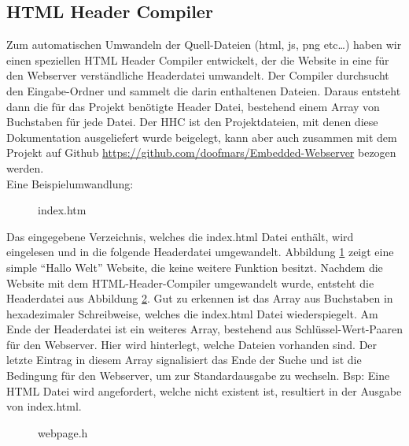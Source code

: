 \newpage

\subsection{HTML Header Compiler}
\label{chap:hintergrund.HHC}

Zum automatischen Umwandeln der Quell-Dateien (html, js, png etc\ldots) haben
wir einen speziellen HTML Header Compiler entwickelt, der die Website in eine
für den Webserver verständliche Headerdatei umwandelt. Der Compiler durchsucht
den Eingabe-Ordner und sammelt die darin enthaltenen Dateien. Daraus entsteht
dann die für das Projekt benötigte Header Datei, bestehend einem Array von
Buchstaben für jede Datei. Der \ac{HHC} ist den Projektdateien, mit denen diese
Dokumentation ausgeliefert wurde beigelegt, kann aber auch zusammen mit dem
Projekt auf Github \url{https://github.com/doofmars/Embedded-Webserver}
bezogen werden.\\

Eine Beispielumwandlung: 

\begin{figure}[H]

\caption{index.htm}
\label{HHC.input}
\end{figure}

Das eingegebene Verzeichnis, welches die \textrm{index.html} Datei enthält, wird
eingelesen und in die folgende Headerdatei umgewandelt.
Abbildung \ref{HHC.input} zeigt eine simple "`Hallo Welt"' Website, die keine
weitere Funktion besitzt. Nachdem die Website mit dem HTML-Header-Compiler
umgewandelt wurde, entsteht die Headerdatei aus Abbildung \ref{HHC.output}. Gut
zu erkennen ist das Array aus Buchstaben in hexadezimaler Schreibweise, welches die
index.html Datei wiederspiegelt.
Am Ende der Headerdatei ist ein weiteres Array, bestehend aus Schlüssel-Wert-Paaren 
für den Webserver. Hier wird hinterlegt, welche Dateien vorhanden sind.
Der letzte Eintrag in diesem Array signalisiert das Ende der Suche und ist die
Bedingung für den Webserver, um zur Standardausgabe zu wechseln. Bsp: Eine HTML
Datei wird angefordert, welche nicht existent ist, resultiert in der Ausgabe von
index.html.

\begin{figure}[H]

\caption{webpage.h}
\label{HHC.output}
\end{figure}

